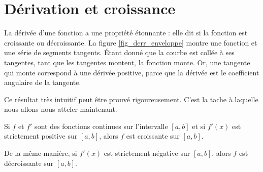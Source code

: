 \documentclass{article}
\begin{document}
					\section{Dérivation et croissance}

La dérivée d'une fonction a une propriété étonnante : elle dit si la fonction est croissante ou décroissante. La figure \ref{fig_derr_enveloppe} montre une fonction et une série de segments tangents. Étant donné que la courbe est \og collée \fg{} à ses tangentes, tant que les tangentes montent, la fonction monte. Or, une tangente qui monte correspond à une dérivée positive, parce que la dérivée est le coefficient angulaire de la tangente.

\newcommand{\CaptionDerrEnveloppe}{Quelque tangentes à la fonction $x\mapsto x^2/3$. Comme tu le vois, la fonction est \og collée\fg{} à ses tangentes.}


Ce résultat très intuitif peut être prouvé rigoureusement. C'est la tache à laquelle nous allons nous atteler maintenant.

\begin{proposition}
	Si $f$ et $f'$ sont des fonctions continues sur l'intervalle $[a,b]$ et si $f'(x)$ est strictement positive sur $[a,b]$, alors $f$ est croissante sur $[a,b]$.

	De la même manière, si $f'(x)$ est strictement négative sur $[a,b]$, alors $f$ est décroissante sur $[a,b]$.
\end{proposition}
\end{document}
